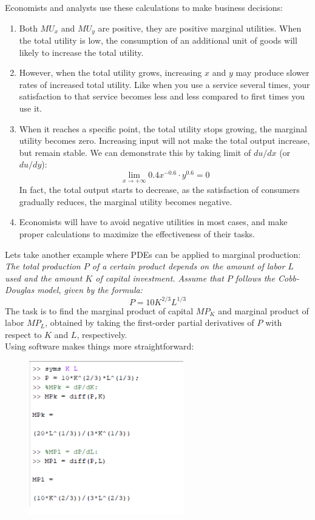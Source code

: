 \documentclass[a4paper]{article}
\begin{document}
	Economists and analysts use these calculations to make business decisions:
	\begin{enumerate}[label=$\bullet$]
		\item Both $MU_x$ and $MU_y$ are positive, they are positive marginal utilities. When the total utility is low, the consumption of an additional unit of goods will likely to increase the total utility.
		\item However, when the total utility grows, increasing $x$ and $y$ may produce slower rates of increased total utility. Like when you use a service several times, your satisfaction to that service becomes less and less compared to first times you use it.
		\item When it reaches a specific point, the total utility stops growing, the marginal utility becomes zero. Increasing input will not make the total output increase, but remain stable. We can demonstrate this by taking limit of $du/dx$ (or $du/dy$):
		\begin{equation*}
		\lim\limits_{x \to +\infty} 0.4x^{-0.6}\cdot y^{0.6} = 0
		\end{equation*}
		In fact, the total output starts to decrease, as the satisfaction of consumers gradually reduces, the marginal utility becomes negative. 
		\item Economists will have to avoid negative utilities in most cases, and make proper calculations to maximize the effectiveness of their tasks.
	\end{enumerate}
	Lets take another example where PDEs can be applied to marginal production: \\
	\emph{The total production $P$ of a certain product depends on the amount of labor $L$ used and the amount $K$ of capital investment. Assume that $P$ follows the Cobb-Douglas model, given by the formula:}
	\begin{equation*}
	P = 10K^{2/3}L^{1/3}
	\end{equation*}
	The task is to find the marginal product of capital $MP_K$ and marginal product of labor $MP_L$, obtained by taking the first-order partial derivatives of $P$ with respect to $K$ and $L$, respectively. \\
	Using software makes things more straightforward:
	\begin{figure}[H]
		\centering
		\includegraphics[width = 0.6\textwidth]{PDE2.png}
	\end{figure}
\end{document}

